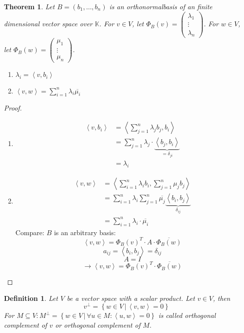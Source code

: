 \documentclass{article}
\newcounter{lecref}[section]
\numberwithin{lecref}{section}
\newtheorem{theorem}[lecref]{Theorem}
\newtheorem{definition}[lecref]{Definition}
\newcommand{\setdef}[2]{\left\{\left.#1\,\right|\,#2\right\}}
\newcommand{\ip}[2]{\left\langle#1,#2\right\rangle} %
\begin{document}
\begin{theorem} %
  Let $B = (b_1, \ldots, b_n)$ is an orthonormalbasis of an finite dimensional vector space over $\mathbb K$.
  For $v \in V$, let $\Phi_B(v) = \begin{pmatrix} \lambda_1 \\ \vdots \\ \lambda_n \end{pmatrix}$.
  For $w \in V$, let $\Phi_B(w) = \begin{pmatrix} \mu_1 \\ \vdots \\ \mu_n \end{pmatrix}$.
  \begin{enumerate}
    \item $\lambda_i = \ip{v}{b_i}$
    \item $\ip vw = \sum_{i=1}^n \lambda_i \overline{\mu_i}$
  \end{enumerate}
\end{theorem}

\begin{proof}
  \begin{enumerate}
    \item
      \begin{align*}
        \ip{v}{b_i} &= \ip{\sum_{j=1}^n \lambda_j b_j}{b_i} \\
                    &= \sum_{j=1}^n \lambda_j \cdot \underbrace{\ip{b_j}{b_i}}_{= \delta_{ji}} \\
                    &= \lambda_i
      \end{align*}
    \item
      \begin{align*}
        \ip vw &= \ip{\sum_{i=1}^n \lambda_i b_i}{\sum_{j=1}^n \mu_j b_j} \\
               &= \sum_{i=1}^n \lambda_i \sum_{j=1}^n \overline{\mu_j} \underbrace{\ip{b_i}{b_j}}_{\delta_{ij}} \\
               &= \sum_{i=1}^n \lambda_i \cdot \overline{\mu_i}
      \end{align*}
      Compare: $B$ is an arbitrary basis:
      \[ \ip vw = \Phi_B(v)^T \cdot A \cdot \overline{\Phi_B(w)} \]
      \[ a_{ij} = \ip{b_i}{b_j} = \delta_{ij} \]
      \[ A = I \]
      \[ \to \ip vw = \Phi_B(v)^T \cdot \overline{\Phi_B(w)} \]
  \end{enumerate}
\end{proof}

\begin{definition}
  Let $V$ be a vector space with a scalar product.
  Let $v \in V$, then
  \[ v^\bot = \setdef{w \in V}{\ip vw = 0} \]
  For $M \subseteq V: M^\bot = \setdef{w \in V}{\forall u \in M: \ip uw = 0}$
  is called \emph{orthogonal complement of $v$} or \emph{orthogonal complement of $M$}.
\end{definition}
\end{document}
